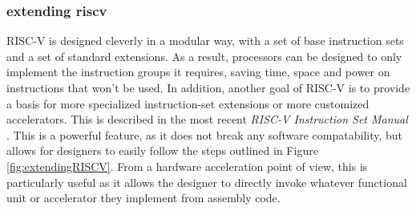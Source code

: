 \subsubsection{extending riscv}
 RISC-V is designed cleverly in a modular way, with a set of base instruction sets and a set of standard extensions. As a result, processors can be designed to only implement the instruction groups it requires, saving time, space and power on instructions that won't be used. In addition, another goal of RISC-V is to provide a basis for more specialized instruction-set extensions or more customized accelerators. This is described in the most recent \textit{RISC-V Instruction Set Manual} \cite{Waterman2019}. This is a powerful feature, as it does not break any software compatability, but allows for designers to easily follow the steps outlined in Figure \ref{fig:extendingRISCV}. From a \gls{hardware acceleration} point of view, this is particularly useful as it allows the designer to directly invoke whatever functional unit or accelerator they implement from assembly code.
    

